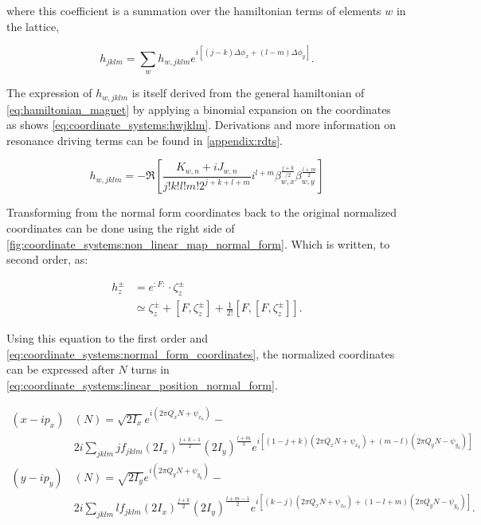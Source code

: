 where this coefficient is a summation over the hamiltonian terms of elements $w$ in the lattice,

\begin{equation}
    h_{jklm} = \sum_w h_{w,jklm} e^{i [(j-k)\Delta \phi_x + (l-m) \Delta \phi_y]}.
\end{equation}

The expression of $h_{w,jklm}$ is itself derived from the general hamiltonian 
of \cref{eq:hamiltonian_magnet} by applying a binomial expansion on the
coordinates~\cite{franchi_studies_2006} as shows \cref{eq:coordinate_systems:hwjklm}.
Derivations and more information on resonance driving terms can be found in \cref{appendix:rdts}.

\begin{equation}
    h_{w,jklm} = -\Re \left[\frac{K_{w,n} + iJ_{w,n}}{j!k!l!m! 2^{j+k+l+m}}
    i^{l+m} \beta_{w,x}^{\frac{j+k}{/2}} \beta_{w,y}^{\frac{l+m}{2}} \right]
    \label{eq:coordinate_systems:hwjklm}
\end{equation}

Transforming from the normal form coordinates back to the original normalized coordinates can be
done using the right side of \cref{fig:coordinate_systems:non_linear_map_normal_form}. Which is
written, to second order, as:

\begin{equation}
    \begin{aligned}
        h_z^{ \pm} &= e^{: F:} \cdot \zeta_z^{ \pm} \\
                   &\simeq \zeta_z^{ \pm}+\left[F, \zeta_z^{ \pm}\right] 
                        + \frac{1}{2!} \left[ F, \left[ F, \zeta_z^\pm \right]\right].
    \end{aligned}
\end{equation}

Using this equation to the first order and \cref{eq:coordinate_systems:normal_form_coordinates}, the
normalized coordinates can be expressed after $N$ turns in
\cref{eq:coordinate_systems:linear_position_normal_form}.

\small
\begin{equation}
    \begin{aligned}
    (x-ip_x)&(N)= \sqrt{2 I_x} e^{i\left(2 \pi Q_x N+\psi_{x_0}\right)}- \\
    & 2 i \sum_{j k l m} j f_{j k l m}\left(2 I_x\right)^{\frac{j+k-1}{2}}\left(2 I_y\right)^{\frac{l+m}{2}} e^{i\left[(1-j+k)\left(2 \pi Q_x N+\psi_{x_0}\right)+(m-l)\left(2 \pi Q_y N-\psi_{y_0}\right)\right]} \\
    (y-ip_y)&(N)= \sqrt{2 I_y} e^{i\left(2 \pi Q_y N+\psi_{y_0}\right)}- \\
    & 2 i \sum_{j k l m} l f_{j k l m}\left(2 I_x\right)^{\frac{j+k}{2}}\left(2 I_y\right)^{\frac{l+m-1}{2}} e^{i\left[(k-j)\left(2 \pi Q_x N+\psi_{x_0}\right)+(1-l+m)\left(2 \pi Q_y N-\psi_{y_0}\right)\right]} .
    \end{aligned}
    \label{eq:coordinate_systems:linear_position_normal_form}
\end{equation}
\normalsize

